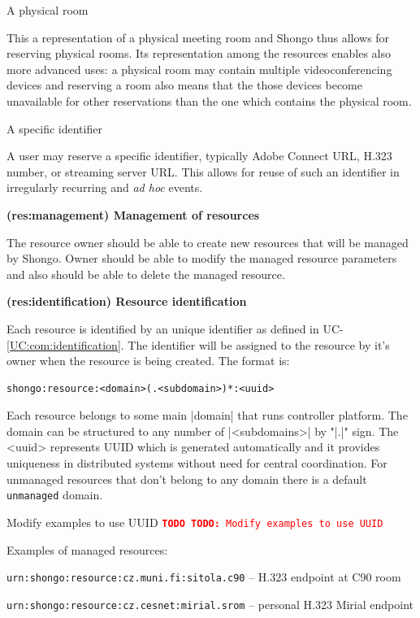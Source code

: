 \documentclass[a4paper]{report}
\makeatletter
\newcommand{\ApiValue}[1]{\verb|#1|}
\newcounter{UCcounter}
\newenvironment{UseCases}%
	{\begin{list}{\textbf{UC-\arabic{UCcounter}}}{\@nmbrlisttrue\def\@listctr{UCcounter}}}%
	{\end{list}}
\newcommand{\UClabel}[1]{\label{UC:#1}}
\newcommand{\UCref}[1]{UC-\ref{UC:#1}}
\newcommand{\UseCase}[2]{\item\UClabel{#2} \textbf{(#2) #1}\\ \nopagebreak}
\newcommand{\TODO}[1]{%
\def\empty{}%
\def\prvniparametr{#1}%
\ifx\prvniparametr\empty%
\begingroup\tt\textcolor{red}{\noindent\textbf{TODO}}\endgroup
\else%
\begingroup\tt\textcolor{red}{\noindent\textbf{TODO:}\ #1}\endgroup
\fi%
}
\makeatother
\begin{document}
\begin{UseCases}
\begin{compactdesc}
\item[A physical room]

This a representation of a physical meeting room and Shongo thus allows for
reserving physical rooms. Its representation among the resources enables also
more advanced uses: a physical room may contain multiple videoconferencing
devices and reserving a room also means that the those devices become
unavailable for other reservations than the one which contains the physical
room.

\item[A specific identifier]

A user may reserve a specific identifier, typically Adobe Connect URL, H.323
number, or streaming server URL. This allows for reuse of such an identifier in
irregularly recurring and \emph{ad hoc} events.

\end{compactdesc}


\UseCase{Management of resources}{res:management}

The resource owner should be able to create new resources that will be managed by Shongo. Owner should be able to modify the managed resource parameters and also should be able to delete the managed resource.

\UseCase{Resource identification}{res:identification}

Each resource is identified by an unique identifier as defined in \UCref{com:identification}. The identifier will be
assigned to the resource by it's owner when the resource is being created. The format is:
\begin{verbatim}
shongo:resource:<domain>(.<subdomain>)*:<uuid>
\end{verbatim}
Each resource belongs to some main |domain| that runs controller platform. The domain can be structured to any number of |<subdomains>| by "|.|" sign. The <uuid> represents UUID \cite{rfc4122} which is generated automatically and it provides uniqueness in distributed systems without need for central coordination. For unmanaged resources that don’t belong to any domain there is a default \ApiValue{unmanaged} domain.

\TODO{Modify examples to use UUID}

Examples of managed resources:
\begin{compactitem}
\item \ApiValue{urn:shongo:resource:cz.muni.fi:sitola.c90} -- H.323 endpoint at C90 room
\item \ApiValue{urn:shongo:resource:cz.cesnet:mirial.srom} -- personal H.323 Mirial endpoint
\end{compactitem}


\end{UseCases}
\end{document}
